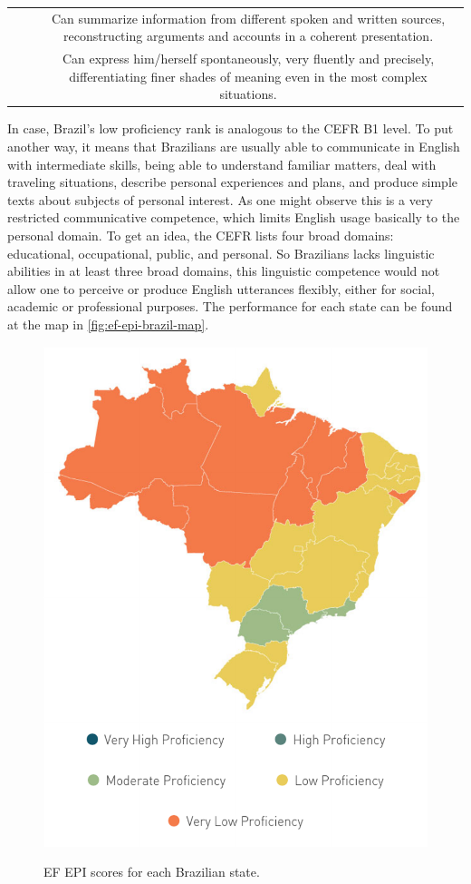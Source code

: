 \begin{table}[!htpb]
\begin{center}
\begin{tabular}{ABC}
 &  & Can summarize information from different spoken and written sources, reconstructing arguments and accounts in a coherent presentation. \\ 
 &  & Can express him/herself spontaneously, very fluently and precisely, differentiating finer shades of meaning even in the most complex situations. \\ \hline
\end{tabular}
\end{center}
\label{tab:cefr-levels}
\end{table}

In case, Brazil's low proficiency rank is analogous to the \ac{CEFR} B1 level. To put another way, it means that Brazilians are usually able to communicate in English with intermediate skills, being able to understand familiar matters, deal with traveling situations, describe personal experiences and plans, and produce simple texts about subjects of personal interest. As one might observe this is a very restricted communicative competence, which limits English usage basically to the personal domain. To get an idea, the \ac{CEFR} lists four broad domains: educational, occupational, public, and personal. So Brazilians lacks linguistic abilities in at least three broad domains, this linguistic competence would not allow one to perceive or produce English utterances flexibly, either for social, academic or professional purposes. The performance for each state can be found at the map in \autoref{fig:ef-epi-brazil-map}.

\begin{figure}[!ht]
        \myfloatalign
        {\includegraphics[width=.8\linewidth]{gfx/ef-epi-brazil-map.pdf}}
        \caption{EF EPI scores for each Brazilian state.}
        \label{fig:ef-epi-brazil-map}
\end{figure}


